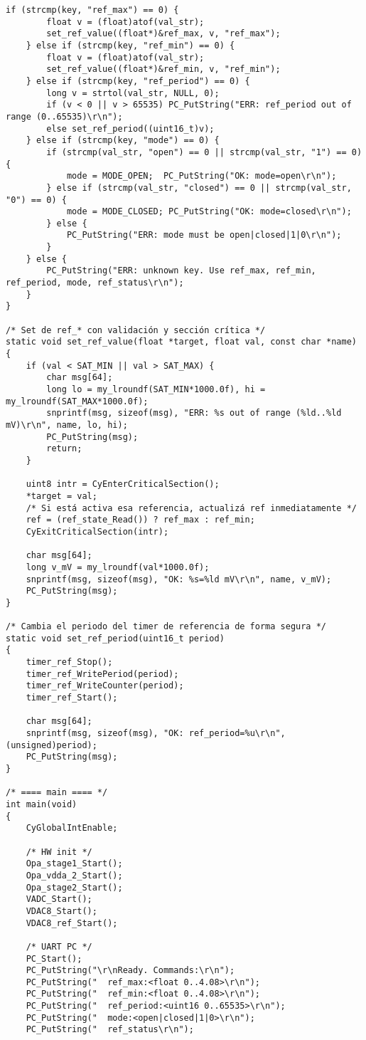 \begin{lstlisting}[style=cstyle,
	caption={Código desarrollado para la implementación de los compensadores con el PSoC en lenguaje C.},
	label={c:psoc}
	]
	if (strcmp(key, "ref_max") == 0) {
		float v = (float)atof(val_str);
		set_ref_value((float*)&ref_max, v, "ref_max");
	} else if (strcmp(key, "ref_min") == 0) {
		float v = (float)atof(val_str);
		set_ref_value((float*)&ref_min, v, "ref_min");
	} else if (strcmp(key, "ref_period") == 0) {
		long v = strtol(val_str, NULL, 0);
		if (v < 0 || v > 65535) PC_PutString("ERR: ref_period out of range (0..65535)\r\n");
		else set_ref_period((uint16_t)v);
	} else if (strcmp(key, "mode") == 0) {
		if (strcmp(val_str, "open") == 0 || strcmp(val_str, "1") == 0) {
			mode = MODE_OPEN;  PC_PutString("OK: mode=open\r\n");
		} else if (strcmp(val_str, "closed") == 0 || strcmp(val_str, "0") == 0) {
			mode = MODE_CLOSED; PC_PutString("OK: mode=closed\r\n");
		} else {
			PC_PutString("ERR: mode must be open|closed|1|0\r\n");
		}
	} else {
		PC_PutString("ERR: unknown key. Use ref_max, ref_min, ref_period, mode, ref_status\r\n");
	}
}

/* Set de ref_* con validación y sección crítica */
static void set_ref_value(float *target, float val, const char *name)
{
	if (val < SAT_MIN || val > SAT_MAX) {
		char msg[64];
		long lo = my_lroundf(SAT_MIN*1000.0f), hi = my_lroundf(SAT_MAX*1000.0f);
		snprintf(msg, sizeof(msg), "ERR: %s out of range (%ld..%ld mV)\r\n", name, lo, hi);
		PC_PutString(msg);
		return;
	}
	
	uint8 intr = CyEnterCriticalSection();
	*target = val;
	/* Si está activa esa referencia, actualizá ref inmediatamente */
	ref = (ref_state_Read()) ? ref_max : ref_min;
	CyExitCriticalSection(intr);
	
	char msg[64];
	long v_mV = my_lroundf(val*1000.0f);
	snprintf(msg, sizeof(msg), "OK: %s=%ld mV\r\n", name, v_mV);
	PC_PutString(msg);
}

/* Cambia el periodo del timer de referencia de forma segura */
static void set_ref_period(uint16_t period)
{
	timer_ref_Stop();
	timer_ref_WritePeriod(period);
	timer_ref_WriteCounter(period);
	timer_ref_Start();
	
	char msg[64];
	snprintf(msg, sizeof(msg), "OK: ref_period=%u\r\n", (unsigned)period);
	PC_PutString(msg);
}

/* ==== main ==== */
int main(void)
{
	CyGlobalIntEnable;
	
	/* HW init */
	Opa_stage1_Start();
	Opa_vdda_2_Start();
	Opa_stage2_Start();
	VADC_Start();
	VDAC8_Start();
	VDAC8_ref_Start();
	
	/* UART PC */
	PC_Start();
	PC_PutString("\r\nReady. Commands:\r\n");
	PC_PutString("  ref_max:<float 0..4.08>\r\n");
	PC_PutString("  ref_min:<float 0..4.08>\r\n");
	PC_PutString("  ref_period:<uint16 0..65535>\r\n");
	PC_PutString("  mode:<open|closed|1|0>\r\n");
	PC_PutString("  ref_status\r\n");
	

\end{lstlisting}
